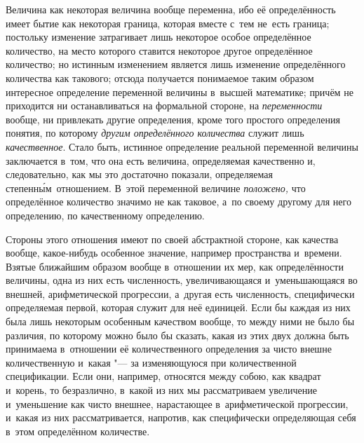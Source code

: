 Величина как некоторая величина вообще переменна, ибо её определённость имеет
бытие как некоторая граница, которая вместе с~тем не~есть граница; постольку
изменение затрагивает лишь некоторое особое определённое количество, на место
которого ставится некоторое другое определённое количество; но истинным
изменением является лишь изменение определённого количества как такового;
отсюда получается понимаемое таким образом интересное определение переменной
величины в~высшей математике; причём не приходится ни останавливаться на
формальной стороне, на {\em переменности} вообще, ни привлекать другие
определения, кроме того простого определения понятия, по которому
{\em другим определённого количества} служит лишь {\em качественное}. Стало
быть, истинное определение реальной переменной величины заключается в~том, что
она есть величина, определяемая качественно и, следовательно, как мы это
достаточно показали, определяемая степенн\'{ы}м~отношением. В~этой переменной
величине {\em положено,} что определённое количество значимо не как таковое,
а~по своему другому для него определению, по качественному определению.

Стороны этого отношения имеют по своей абстрактной стороне, как качества
вообще, какое-нибудь особенное значение, например пространства и~времени.
Взятые ближайшим образом вообще в~отношении их мер, как определённости
величины, одна из них есть численность, увеличивающаяся и~уменьшающаяся во
внешней, арифметической прогрессии, а~другая есть численность, специфически
определяемая первой, которая служит для неё единицей. Если бы каждая из них
была лишь некоторым особенным качеством вообще, то между ними не было бы
различия, по которому можно было бы сказать, какая из этих двух должна быть
принимаема в~отношении её количественного определения за чисто внешне
количественную и~какая "--- за изменяющуюся при количественной спецификации.
Если они, например, относятся между собою, как квадрат и~корень, то
безразлично, в~какой из них мы рассматриваем увеличение и~уменьшение как чисто
внешнее, нарастающее в~арифметической прогрессии, и~какая из них
рассматривается, напротив, как специфически определяющая себя в~этом
определённом количестве.

